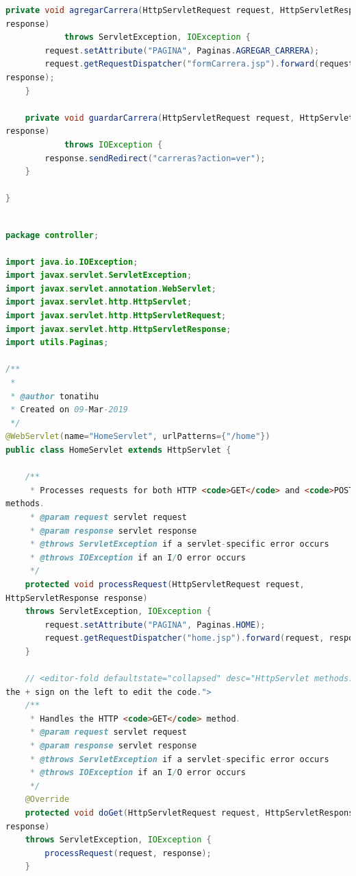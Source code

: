 \documentclass[a4paper,12pt]{article}
\begin{document}
\begin{lstlisting}[language=Java, style=customJava, 
caption={CarrerasServlet.java}, captionpos=b,basicstyle=\fontfamily{cmss}\small]
    private void agregarCarrera(HttpServletRequest request, HttpServletResponse 
response) 
            throws ServletException, IOException {
        request.setAttribute("PAGINA", Paginas.AGREGAR_CARRERA);
        request.getRequestDispatcher("formCarrera.jsp").forward(request, 
response);
    }

    private void guardarCarrera(HttpServletRequest request, HttpServletResponse 
response) 
            throws IOException {
        response.sendRedirect("carreras?action=ver");
    }

}
\end{lstlisting}

\begin{lstlisting}[language=Java, style=customJava, 
caption={HomeServlet.java}, captionpos=b,basicstyle=\fontfamily{cmss}\small]

package controller;

import java.io.IOException;
import javax.servlet.ServletException;
import javax.servlet.annotation.WebServlet;
import javax.servlet.http.HttpServlet;
import javax.servlet.http.HttpServletRequest;
import javax.servlet.http.HttpServletResponse;
import utils.Paginas;

/**
 *
 * @author tonatihu
 * Created on 09-Mar-2019
 */
@WebServlet(name="HomeServlet", urlPatterns={"/home"})
public class HomeServlet extends HttpServlet {
   
    /** 
     * Processes requests for both HTTP <code>GET</code> and <code>POST</code> 
methods.
     * @param request servlet request
     * @param response servlet response
     * @throws ServletException if a servlet-specific error occurs
     * @throws IOException if an I/O error occurs
     */
    protected void processRequest(HttpServletRequest request, 
HttpServletResponse response)
    throws ServletException, IOException {
        request.setAttribute("PAGINA", Paginas.HOME);
        request.getRequestDispatcher("home.jsp").forward(request, response);
    } 

    // <editor-fold defaultstate="collapsed" desc="HttpServlet methods. Click on 
the + sign on the left to edit the code.">
    /** 
     * Handles the HTTP <code>GET</code> method.
     * @param request servlet request
     * @param response servlet response
     * @throws ServletException if a servlet-specific error occurs
     * @throws IOException if an I/O error occurs
     */
    @Override
    protected void doGet(HttpServletRequest request, HttpServletResponse 
response)
    throws ServletException, IOException {
        processRequest(request, response);
    } 


\end{lstlisting}
\end{document}
